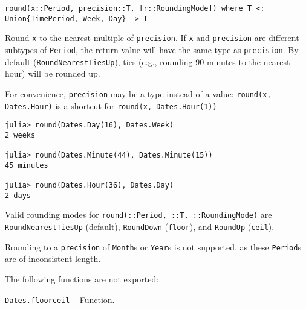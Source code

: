 \begin{adjustwidth}{2em}{0pt}


\begin{verbatim}
round(x::Period, precision::T, [r::RoundingMode]) where T <: Union{TimePeriod, Week, Day} -> T
\end{verbatim}

Round \texttt{x} to the nearest multiple of \texttt{precision}. If \texttt{x} and \texttt{precision} are different subtypes of \texttt{Period}, the return value will have the same type as \texttt{precision}. By default (\texttt{RoundNearestTiesUp}), ties (e.g., rounding 90 minutes to the nearest hour) will be rounded up.

For convenience, \texttt{precision} may be a type instead of a value: \texttt{round(x, Dates.Hour)} is a shortcut for \texttt{round(x, Dates.Hour(1))}.


\begin{verbatim}
julia> round(Dates.Day(16), Dates.Week)
2 weeks

julia> round(Dates.Minute(44), Dates.Minute(15))
45 minutes

julia> round(Dates.Hour(36), Dates.Day)
2 days
\end{verbatim}

Valid rounding modes for \texttt{round(::Period, ::T, ::RoundingMode)} are \texttt{RoundNearestTiesUp} (default), \texttt{RoundDown} (\texttt{floor}), and \texttt{RoundUp} (\texttt{ceil}).

Rounding to a \texttt{precision} of \texttt{Month}s or \texttt{Year}s is not supported, as these \texttt{Period}s are of inconsistent length.



\end{adjustwidth}

The following functions are not exported:


\hypertarget{12245544538142909757}{} 
\hyperlink{12245544538142909757}{\texttt{Dates.floorceil}}  -- {Function.}

